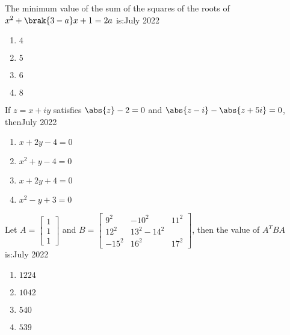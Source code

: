 \iffalse
   \title{Assignment}
   \author{EE24BTECH11034}
   \section{mcq-single}
\fi 

    \item The minimum value of the sum of the squares of the roots of $x^2 + \brak{3-a}x + 1 = 2a$ is:\hfill{July 2022}
    
        \begin{multicols}{4}
        \begin{enumerate}
        \item $4$
        \item $5$
        \item $6$
        \item $8$
        \end{enumerate}
        \end{multicols}
        
    \item If $z = x + iy$ satisfies $\abs{z} - 2 = 0$ and $\abs{z - i} - \abs{z + 5i} = 0$, then\hfill{July 2022}

        \begin{multicols}{4}
        \begin{enumerate}
        \item $x + 2y - 4 = 0$
        \item $x^{2} + y - 4 = 0$
        \item $x + 2y + 4 = 0$
        \item $x^{2} - y + 3 = 0$
        \end{enumerate}
        \end{multicols}

    \item Let $A = \begin{bmatrix} 1\\ 1\\ 1 \end{bmatrix}$ and $B = \begin{bmatrix} 9^{2} & -10^{2} & 11^{2} \\ 12^{2} & 13^{2} - 14^{2} \\ -15^{2} & 16^{2} & 17^{2} \end{bmatrix}$, then the value of $A^{T} B A$ is:\hfill{July 2022}

        \begin{multicols}{4}
        \begin{enumerate}
        \item $1224$
        \item $1042$
        \item $540$
        \item $539$
        \end{enumerate}
        \end{multicols}
        
